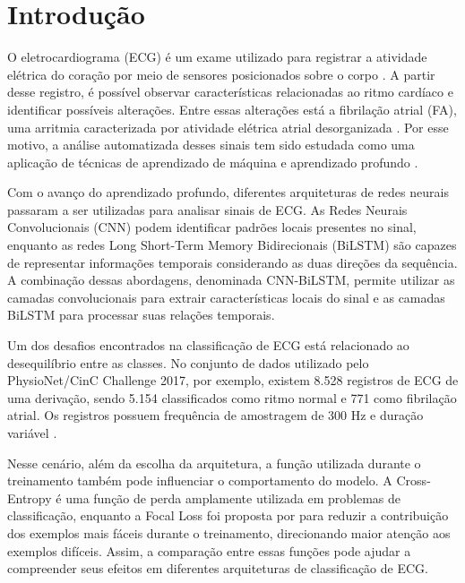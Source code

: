 \documentclass[
    12pt,                %
    openright,           %
    oneside,             %
    a4paper,             %
    english,             %
    brazil               %
]{abntex2}
\begin{document}
\textual

\chapter{Introdução}
\label{cap:introducao}

O eletrocardiograma (ECG) é um exame utilizado para registrar a 
atividade elétrica do coração por meio de sensores posicionados 
sobre o corpo \cite{VanGelder2024}. A partir desse registro, 
é possível observar características relacionadas ao ritmo cardíaco 
e identificar possíveis alterações. Entre essas alterações está a 
fibrilação atrial (FA), uma arritmia caracterizada por atividade elétrica 
atrial desorganizada \cite{VanGelder2024}. Por esse motivo, a análise 
automatizada desses sinais tem sido estudada como uma aplicação de técnicas 
de aprendizado de máquina e aprendizado profundo \cite{Efe2024,AlMousa2023}.

Com o avanço do aprendizado profundo, diferentes arquiteturas de redes neurais 
passaram a ser utilizadas para analisar sinais de ECG. As Redes Neurais Convolucionais (CNN) 
podem identificar padrões locais presentes no sinal, enquanto as redes Long Short-Term Memory Bidirecionais (BiLSTM) 
são capazes de representar informações temporais considerando as duas direções da sequência. A combinação dessas abordagens, 
denominada CNN-BiLSTM, permite utilizar as camadas convolucionais para extrair características locais do sinal e as camadas 
BiLSTM para processar suas relações temporais.

Um dos desafios encontrados na classificação de ECG está relacionado ao desequilíbrio entre as classes. No conjunto de dados utilizado 
pelo PhysioNet/CinC Challenge 2017, por exemplo, existem 8.528 registros de ECG de uma derivação, sendo 5.154 classificados 
como ritmo normal e 771 como fibrilação atrial. Os registros possuem frequência de amostragem de 300 Hz e duração variável \cite{Clifford2017}.

Nesse cenário, além da escolha da arquitetura, a função utilizada durante o treinamento também pode influenciar o comportamento 
do modelo. A Cross-Entropy é uma função de perda amplamente utilizada em problemas de classificação, enquanto a Focal Loss 
foi proposta por  para reduzir a contribuição dos exemplos mais fáceis durante o treinamento, direcionando 
maior atenção aos exemplos difíceis. Assim, a comparação entre essas funções pode ajudar a compreender 
seus efeitos em diferentes arquiteturas de classificação de ECG.
\end{document}
